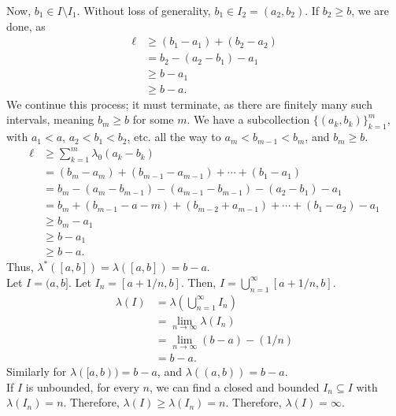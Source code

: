 \documentclass[10pt]{extarticle}
\begin{document}
\begin{description}
      Now, $b_1 \in I\setminus I_1$. Without loss of generality, $b_1\in I_2 = (a_2,b_2)$. If $b_2 \geq b$, we are done, as 
      \begin{align*}
        \ell &\geq (b_1-a_1) + (b_2 - a_2)\\
             &= b_2 - (a_2 - b_1) - a_1\\
             &\geq b-a_1 \\
             &\geq b-a.
      \end{align*}
      We continue this process; it must terminate, as there are finitely many such intervals, meaning $b_m\geq b$ for some $m$. We have a subcollection $\{(a_k,b_k)\}_{k=1}^{m}$, with $a_1 < a$, $a_2 < b_1 < b_2$, etc. all the way to $a_m < b_{m-1} < b_m$, and $b_m \geq b$.
      \begin{align*}
        \ell &\geq \sum_{k=1}^{m}\lambda_0(a_k - b_k)\\
             &= (b_m - a_m) + \left(b_{m-1} - a_{m-1}\right) + \cdots + \left(b_1 - a_1\right)\\
             &= b_m - (a_m - b_{m-1}) - (a_{m-1} - b_{m-1}) - (a_2 - b_1) - a_1\\
             &= b_{m} + (b_{m-1} - a-m) + \left(b_{m-2} + a_{m-1}\right) + \cdots + (b_1 - a_2) - a_1\\
             &\geq b_m - a_1\\
             &\geq b-a_1\\
             &\geq b-a.
      \end{align*}
      Thus, $\lambda^{\ast}([a,b]) = \lambda([a,b]) = b-a$.\\

      Let $I = (a,b]$. Let $I_n = [a+1/n,b]$. Then, $I = \bigcup_{n=1}^{\infty}[a+1/n,b]$.
      \begin{align*}
        \lambda(I) &= \lambda\left(\bigcup_{n=1}^{\infty}I_n\right)\\
                   &= \lim_{n\rightarrow\infty} \lambda(I_n)\\
                   &= \lim_{n\rightarrow\infty} (b-a)-(1/n)\\
                   &= b-a.
      \end{align*}
      Similarly for $\lambda([a,b)) = b-a$, and $\lambda((a,b)) = b-a$.\\

      If $I$ is unbounded, for every $n$, we can find a closed and bounded $I_n\subseteq I$ with $\lambda(I_n) = n$. Therefore, $\lambda(I) \geq \lambda(I_n) = n$. Therefore, $\lambda(I) = \infty$.
  \end{description}
\end{document}
